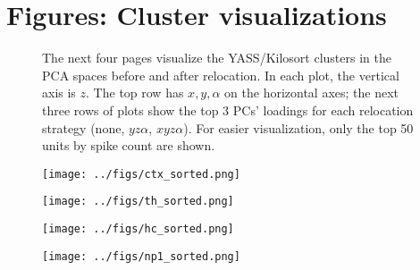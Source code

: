 \documentclass[
  12pt,
]{article}
\theoremstyle{plain}
\theoremstyle{definition}
\theoremstyle{remark}
\newcommand{\1}[1]{\mathbb{1}_{{#1}}}
\begin{document}
\FloatBarrier
\pagebreak
\section{Figures: Cluster visualizations}

\begin{figure}[H]
\caption{The next four pages visualize the YASS/Kilosort clusters in the PCA spaces before and after relocation. In each plot, the vertical axis is $z$. The top row has $x,y,\alpha$ on the horizontal axes; the next three rows of plots show the top 3 PCs' loadings for each relocation strategy (none, $yz\alpha$, $xyz\alpha$). For easier visualization, only the top 50 units by spike count are shown.}
\label{fig:sorted}
\end{figure}

\begin{figure}[hbtp]
\vspace{-0.75in}
\begin{adjustwidth*}{-2in}{-2in}\begin{center}
\texttt{[image: ../figs/ctx\_sorted.png]}
\end{center}\end{adjustwidth*}
\end{figure}
\begin{figure}[hbtp]
\vspace{-0.75in}
\begin{adjustwidth*}{-2in}{-2in}\begin{center}
\texttt{[image: ../figs/th\_sorted.png]}
\end{center}\end{adjustwidth*}
\end{figure}
\begin{figure}[hbtp]
\vspace{-0.75in}
\begin{adjustwidth*}{-2in}{-2in}\begin{center}
\texttt{[image: ../figs/hc\_sorted.png]}
\end{center}\end{adjustwidth*}
\end{figure}
\begin{figure}[hbtp]
\vspace{-0.75in}
\begin{adjustwidth*}{-2in}{-2in}\begin{center}
\texttt{[image: ../figs/np1\_sorted.png]}
\end{center}\end{adjustwidth*}
\end{figure}
\end{document}
